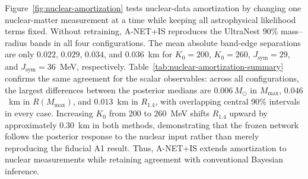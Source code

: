 \documentclass[aps,prd,twocolumn,superscriptaddress,nofootinbib,longbibliography]{revtex4-2}
\begin{document}
Figure~\ref{fig:nuclear-amortization} tests nuclear-data
amortization by changing one nuclear-matter measurement at a time while
keeping all astrophysical likelihood terms fixed. Without retraining,
A-NET+IS reproduces the UltraNest 90\% mass--radius bands in all four
configurations. The mean absolute band-edge separations are only $0.022$,
$0.029$, $0.034$, and $0.036$~km for $K_0=200$, $K_0=260$,
$J_{\mathrm{sym}}=29$, and $J_{\mathrm{sym}}=36$~MeV, respectively.
Table~\ref{tab:nuclear-amortization-summary} confirms the same agreement for
the scalar observables: across all configurations, the largest differences
between the posterior medians are $0.006\,M_\odot$ in $M_{\max}$, $0.046$~km
in $R(M_{\max})$, and $0.013$~km in $R_{1.4}$, with overlapping central 90\%
intervals in every case. Increasing $K_0$ from $200$ to $260$~MeV shifts
$R_{1.4}$ upward by approximately $0.30$~km in both methods, demonstrating
that the frozen network follows the posterior response to the nuclear input
rather than merely reproducing the fiducial A1 result. Thus, A-NET+IS extends
amortization to nuclear measurements while retaining agreement with
conventional Bayesian inference.
\end{document}
